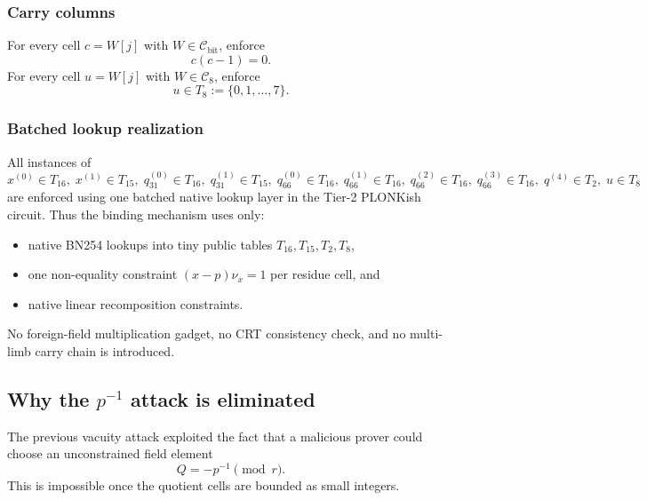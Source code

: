 ﻿\documentclass[11pt]{article}
\newcommand{\Cset}{\mathcal{C}}
\begin{document}
\subsubsection{Carry columns}

For every cell \(c=W[j]\) with \(W\in\Cset_{\mathrm{bit}}\), enforce
\begin{equation}
c(c-1)=0.
\label{eq:bit-carry}
\end{equation}
For every cell \(u=W[j]\) with \(W\in\Cset_{8}\), enforce
\begin{equation}
u \in T_8 := \{0,1,\dots,7\}.
\label{eq:u8-lookup}
\end{equation}

\subsubsection{Batched lookup realization}

All instances of
\[
x^{(0)}\in T_{16},\;
x^{(1)}\in T_{15},\;
q_{31}^{(0)}\in T_{16},\;
q_{31}^{(1)}\in T_{15},\;
q_{66}^{(0)}\in T_{16},\;
q_{66}^{(1)}\in T_{16},\;
q_{66}^{(2)}\in T_{16},\;
q_{66}^{(3)}\in T_{16},\;
q^{(4)}\in T_2,\;
u\in T_8
\]
are enforced using one batched native lookup layer in the Tier-2 PLONKish circuit. Thus the binding mechanism uses only:
\begin{itemize}[leftmargin=2em]
    \item native BN254 lookups into tiny public tables \(T_{16},T_{15},T_2,T_8\),
    \item one non-equality constraint \((x-p)\nu_x=1\) per residue cell, and
    \item native linear recomposition constraints.
\end{itemize}
No foreign-field multiplication gadget, no CRT consistency check, and no multi-limb carry chain is introduced.

\subsection{Why the \(p^{-1}\) attack is eliminated}

The previous vacuity attack exploited the fact that a malicious prover could choose an unconstrained field element
\[
Q = -p^{-1}\pmod r.
\]
This is impossible once the quotient cells are bounded as small integers.
\end{document}
